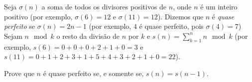 Seja $\sigma(n)$ a soma de todos os divisores positivos de $n$, onde $n$ é um inteiro positivo (por exemplo, $\sigma(6) = 12$ e $\sigma(11) = 12$).
Dizemos que $n$ é \textit{quase perfeito} se $\sigma(n) = 2n-1$ (por exemplo, $4$ é quase perfeito, pois $\sigma(4) = 7$) Sejam $n \mod{k}$ o resto da divisão de $n$ por $k$ e $s(n) = \displaystyle\sum_{k=1}^n n \mod{k}$ (por exemplo, $s(6) = 0 + 0 + 0 + 2 + 1 + 0 = 3$ e $s(11) = 0 + 1 + 2 + 3 + 1 + 5 + 4 + 3 + 2 + 1 + 0 = 22$).

Prove que $n$ é quase perfeito se, e somente se, $s(n) = s(n-1)$.